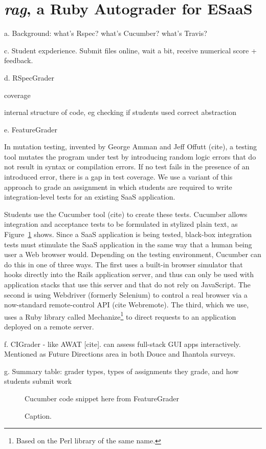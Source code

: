 \section{\emph{rag}, a Ruby Autograder for ESaaS}



a.	Background: what's Rspec? what's Cucumber? what's Travis?


c.	Student expderience. Submit files online, wait a bit, receive numerical score + feedback.

d.	RSpecGrader

coverage

internal structure of code, eg checking if students used correct
abstraction 



e.	FeatureGrader


In mutation testing, invented by George Amman and Jeff Offutt (cite), a
testing tool mutates the program under test by introducing random logic
errors that do not result in syntax or compilation errors.  If no test fails
in the presence of an introduced error, there is a gap in test
coverage.  We use a variant of this approach to grade an
assignment in which students are required to write integration-level
tests for an existing SaaS application.

Students use the Cucumber tool (cite) to create these tests.
Cucumber allows integration and acceptance tests to be formulated in
stylized plain text, as Figure~\ref{fig:cucumber} shows.
Since a SaaS application is being tested, black-box integration tests
must stimulate the SaaS application in the same way that
a human being user a Web browser would.
Depending on the testing environment, Cucumber can do this in one of
three ways.  The first uses a built-in browser simulator that hooks
directly into 
the Rails application server, and thus can only be used
with application stacks that use this server and that do not rely on
JavaScript.  The second is using Webdriver (formerly 
Selenium) to control a real browser via a now-standard remote-control
API (cite Webremote).  The third, which we use, uses a Ruby library called
Mechanize\footnote{Based on the Perl library of the same name.} to
direct requests to an application deployed on  a remote server.  


f.	CIGrader - like AWAT [cite]. can assess full-stack GUI apps interactively. Mentioned as Future  Directions area in both Douce and Ihantola surveys.

g.	Summary table: grader types, types of assignments they grade, and how students submit work



\begin{figure}
  Cucumber code snippet here from FeatureGrader
  \caption{\label{fig:cucumber}%
 Caption.
}
\end{figure}

